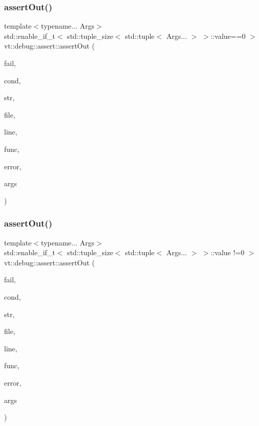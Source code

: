 \subsubsection{\texorpdfstring{assert\+Out()}{assertOut()}\hspace{0.1cm}{\footnotesize\ttfamily [1/2]}}
{\footnotesize\ttfamily template$<$typename... Args$>$ \\
std\+::enable\+\_\+if\+\_\+t$<$ std\+::tuple\+\_\+size$<$ std\+::tuple$<$ Args... $>$ $>$\+::value==0 $>$ vt\+::debug\+::assert\+::assert\+Out (\begin{DoxyParamCaption}\item[{bool}]{fail,  }\item[{std\+::string const}]{cond,  }\item[{std\+::string const \&}]{str,  }\item[{std\+::string const \&}]{file,  }\item[{int const}]{line,  }\item[{std\+::string const \&}]{func,  }\item[{\hyperlink{namespacevt_a793764d753923abc3d32929870beb485}{Error\+Code\+Type}}]{error,  }\item[{std\+::tuple$<$ Args... $>$ \&\&}]{args }\end{DoxyParamCaption})\hspace{0.3cm}{\ttfamily [inline]}}

\mbox{\label{namespacevt_1_1debug_1_1assert_a4bc7c613ca106f6d3d7867389c4380d0}} 
\subsubsection{\texorpdfstring{assert\+Out()}{assertOut()}\hspace{0.1cm}{\footnotesize\ttfamily [2/2]}}
{\footnotesize\ttfamily template$<$typename... Args$>$ \\
std\+::enable\+\_\+if\+\_\+t$<$ std\+::tuple\+\_\+size$<$ std\+::tuple$<$ Args... $>$ $>$\+::value !=0 $>$ vt\+::debug\+::assert\+::assert\+Out (\begin{DoxyParamCaption}\item[{bool}]{fail,  }\item[{std\+::string const}]{cond,  }\item[{std\+::string const \&}]{str,  }\item[{std\+::string const \&}]{file,  }\item[{int const}]{line,  }\item[{std\+::string const \&}]{func,  }\item[{\hyperlink{namespacevt_a793764d753923abc3d32929870beb485}{Error\+Code\+Type}}]{error,  }\item[{std\+::tuple$<$ Args... $>$ \&\&}]{args }\end{DoxyParamCaption})\hspace{0.3cm}{\ttfamily [inline]}}

